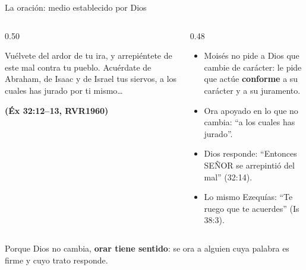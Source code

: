 \documentclass[hyperref={bookmarks=false},aspectratio=169]{beamer}
\newcommand{\SENOR}{S{\fontsize{0.78em}{1em}\selectfont EÑOR}}
\newcommand{\fuente}[1]{\par\hfill{\upshape\bfseries\footnotesize\textcolor{azul}{#1}}}
\newcommand{\destacar}[1]{\textbf{\textcolor{azul}{#1}}}
\begin{document}
\begin{frame}{La oración: medio establecido por Dios}
\begin{columns}[t,onlytextwidth]
\begin{column}{0.50\textwidth}
\begin{cita}Vuélvete del ardor de tu ira, y arrepiéntete de este mal contra tu pueblo. Acuérdate de Abraham, de Isaac y de Israel tus siervos, a los cuales has jurado por ti mismo\ldots\fuente{(Éx 32:12--13, RVR1960)}\end{cita}
\end{column}
\begin{column}{0.48\textwidth}\small
\begin{itemize}
\item Moisés no pide a Dios que cambie de carácter: le pide que actúe \destacar{conforme} a su carácter y a su juramento.
\item Ora apoyado en lo que no cambia: ``a los cuales has jurado''.
\item Dios responde: ``Entonces \SENOR{} se arrepintió del mal'' (32:14).
\item Lo mismo Ezequías: ``Te ruego que te acuerdes'' (Is 38:3).
\end{itemize}
\end{column}
\end{columns}\par\smallskip
\small\RaggedRight Porque Dios no cambia, \destacar{orar tiene sentido}: se ora a alguien cuya palabra es firme y cuyo trato responde.
\end{frame}
\end{document}
